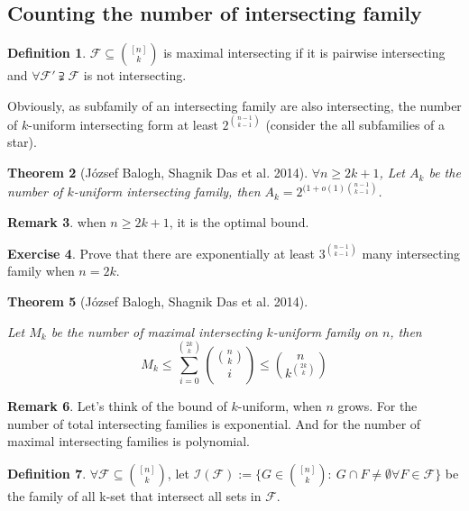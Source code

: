 \documentclass{article}
\newtheorem{theorem}{Theorem}[section]
\theoremstyle{definition}
\newtheorem{remark}[theorem]{Remark}
\newtheorem{definition}[theorem]{Definition}
\newtheorem{exercise}[theorem]{Exercise}
\begin{document}
\subsection{Counting the number of intersecting family}
\begin{definition}
    $\mathcal{F}\subseteq \binom{[n]}{k}$ is maximal intersecting if it is pairwise intersecting and $\forall \mathcal{F}'\supsetneqq \mathcal{F}$ is not intersecting.
\end{definition}
Obviously, as subfamily of an intersecting family are also intersecting, the number of $k$-uniform intersecting form at least $2^{\binom{n-1}{k-1}}$ (consider the all subfamilies of a star).

\begin{theorem}[J\'ozsef Balogh, Shagnik Das et al.\cite{balogh2015intersecting} 2014]
    $\forall n\ge 2k+1$, Let $A_k$ be the number of $k$-uniform intersecting family, then $A_k=2^{(1+o(1)\binom{n-1}{k-1}}$.
\end{theorem}

\begin{remark}
    when $n\ge 2k+1$, it is the optimal bound.
\end{remark}

\begin{exercise}
    Prove that there are exponentially at least $3^{\binom{n-1}{k-1}}$ many intersecting family when $n=2k$.
\end{exercise}

\begin{theorem}[J\'ozsef Balogh, Shagnik Das et al.\cite{balogh2015intersecting} 2014]\label{maxIntersecting} 

Let $M_k$ be the number of maximal intersecting $k$-uniform family on $n$, then 
$$M_k\le \underset{i=0}{\overset{\binom{2k}{k}}{\sum}}{\binom{\binom{n}{k}}{i}}\le \binom{n}{k^{\binom{2k}{k}}}$$
\end{theorem}

\begin{remark}
    Let's think of the bound of $k$-uniform, when $n$ grows. For the number of total intersecting families is exponential. And for the number of maximal intersecting families is polynomial. 
\end{remark}

\begin{definition}
    $\forall \mathcal{F} \subseteq \binom{[n]}{k}$, let $\mathcal{I}(\mathcal{F}):=\{G\in\binom{[n]}{k}:~G\cap F \ne \emptyset \forall F\in \mathcal{F}\}$ be the family of all k-set that intersect all sets in $\mathcal{F}$.
\end{definition}
\end{document}
